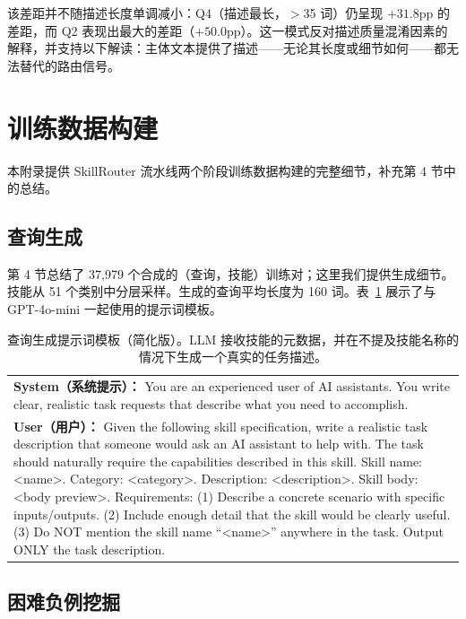 \documentclass[11pt,UTF8,fontset=fandol]{ctexart}
\begin{document}
该差距并不随描述长度单调减小：Q4（描述最长，$>$35 词）仍呈现 $+31.8$pp 的差距，而 Q2 表现出最大的差距（$+50.0$pp）。这一模式反对描述质量混淆因素的解释，并支持以下解读：主体文本提供了描述——无论其长度或细节如何——都无法替代的路由信号。

\section{训练数据构建}

本附录提供 SkillRouter 流水线两个阶段训练数据构建的完整细节，补充第 4 节中的总结。

\subsection{查询生成}

第 4 节总结了 37,979 个合成的（查询，技能）训练对；这里我们提供生成细节。技能从 51 个类别中分层采样。生成的查询平均长度为 160 词。表~\ref{tab:15} 展示了与 GPT-4o-mini 一起使用的提示词模板。

\begin{table}[H]\centering
\caption{查询生成提示词模板（简化版）。LLM 接收技能的元数据，并在不提及技能名称的情况下生成一个真实的任务描述。}
\begin{tabular}{p{14cm}}
\toprule
\textbf{System（系统提示）：} You are an experienced user of AI assistants. You write clear, realistic task requests that describe what you need to accomplish. \\[0.4em]
\textbf{User（用户）：} Given the following skill specification, write a realistic task description that someone would ask an AI assistant to help with. The task should naturally require the capabilities described in this skill. Skill name: {\textless}name{\textgreater}. Category: {\textless}category{\textgreater}. Description: {\textless}description{\textgreater}. Skill body: {\textless}body preview{\textgreater}. Requirements: (1) Describe a concrete scenario with specific inputs/outputs. (2) Include enough detail that the skill would be clearly useful. (3) Do NOT mention the skill name ``{\textless}name{\textgreater}'' anywhere in the task. Output ONLY the task description. \\
\bottomrule
\end{tabular}
\label{tab:15}
\end{table}

\subsection{困难负例挖掘}
\end{document}
